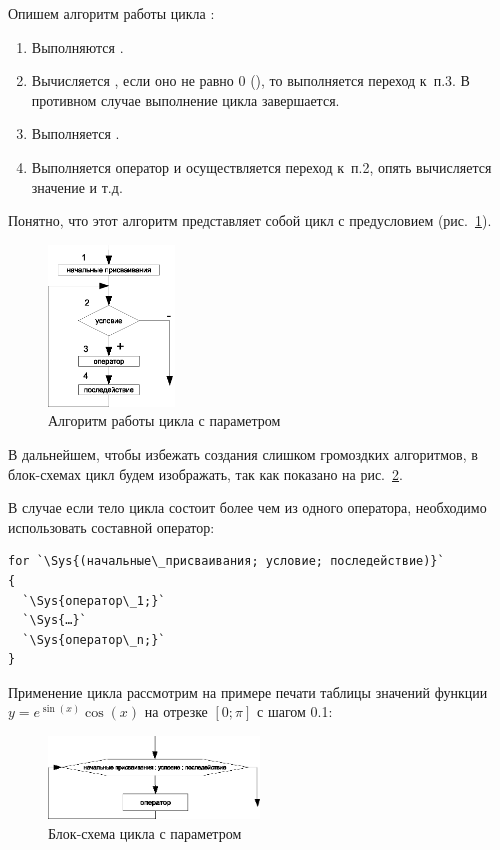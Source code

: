 Опишем алгоритм работы цикла :
\begin{enumerate}
\item Выполняются .
\item Вычисляется , если оно не равно 0 (), то выполняется переход к~п.3.
В противном случае выполнение цикла завершается.
\item Выполняется . 
\item Выполняется оператор  и осуществляется переход к~п.2,  опять вычисляется значение
 и т.д.
\end{enumerate}
Понятно, что этот алгоритм представляет собой цикл с предусловием (рис.~\ref{ch03:refDrawing24}).
\begin{figure}[htb]
\begin{center}
\includegraphics[width=0.3\textwidth]{img/ris_3_25}
\caption{Алгоритм работы цикла с параметром}
\label{ch03:refDrawing24}
\end{center}
\end{figure}

В дальнейшем, чтобы избежать создания слишком громоздких алгоритмов, в блок-схемах цикл  будем
изображать, так как показано на рис.~\ref{ch03:refDrawing25}.

В случае если тело цикла состоит более чем из одного оператора, необходимо использовать составной оператор:
\begin{lstlisting}
for `\Sys{(начальные\_присваивания; условие; последействие)}`
{
  `\Sys{оператор\_1;}`
  `\Sys{…}`
  `\Sys{оператор\_n;}`
}
\end{lstlisting}
Применение цикла  рассмотрим на примере печати таблицы значений функции  $y=e^{\sin (x)}\cos (x)$
на отрезке  $[0;\pi]$  с шагом 0.1:
\begin{figure}[htb]
\begin{center}
\includegraphics[width=0.5\textwidth]{img/ris_3_26}
\caption{Блок-схема цикла с параметром}
\label{ch03:refDrawing25}
\end{center}
\end{figure}

